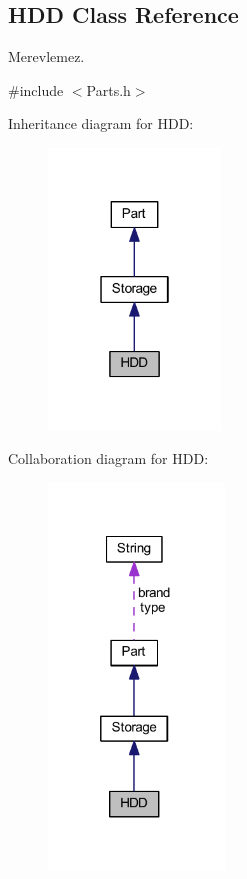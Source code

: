 \hypertarget{class_h_d_d}{}\subsection{H\+DD Class Reference}
\label{class_h_d_d}


Merevlemez.  




{\ttfamily \#include $<$Parts.\+h$>$}



Inheritance diagram for H\+DD\+:
\nopagebreak
\begin{figure}[H]
\begin{center}
\leavevmode
\includegraphics[width=130pt]{class_h_d_d__inherit__graph}
\end{center}
\end{figure}


Collaboration diagram for H\+DD\+:
\nopagebreak
\begin{figure}[H]
\begin{center}
\leavevmode
\includegraphics[width=133pt]{class_h_d_d__coll__graph}
\end{center}
\end{figure}
